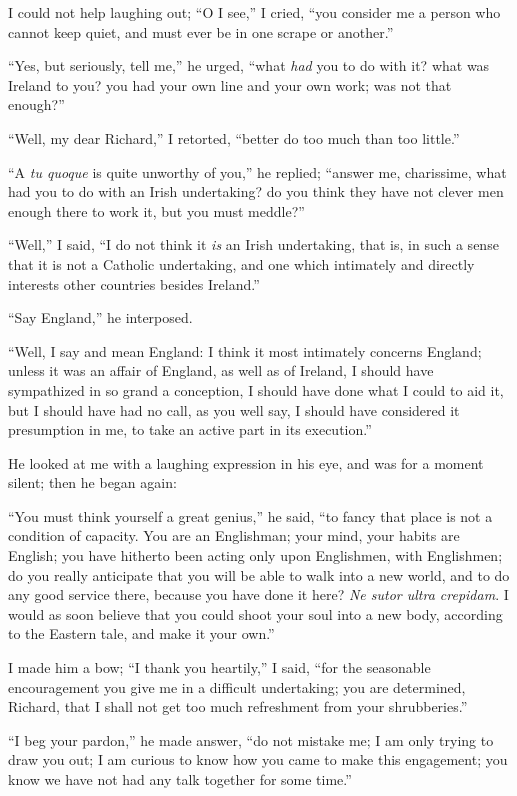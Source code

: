 I could not help laughing out; ``O I see,'' I cried,
``you consider me a person who cannot keep quiet, and must ever be
in one scrape or another.''

``Yes, but seriously, tell me,'' he urged, ``what \emph{had}
you to do with it? what was Ireland to you? you had your own line and
your own work; was not that enough?''

``Well, my dear Richard,'' I retorted, ``better do too
much than too little.''

``A \emph{tu quoque} is quite unworthy of you,'' he
replied; ``answer me, charissime, what had you to do with an Irish
undertaking? do you think they have not clever men enough there to
work it, but you must meddle?''

``Well,'' I said, ``I do not think it \emph{is} an
Irish undertaking, that is, in such a sense that it is not a Catholic
undertaking, and one which intimately and directly interests other
countries besides Ireland.''

``Say England,'' he interposed.

``Well, I say and mean England: I think it most intimately
concerns England; unless it was an affair of England, as well as of
Ireland, I should have sympathized in so grand a conception, I should
have done what I could to aid it, but I should have had no call, as
you well say, I should have considered it presumption in me, to take
an active part in its execution.''

He looked at me with a laughing expression in his eye, and was for
a moment silent; then he began again:

``You must think yourself a great genius,'' he said,
``to fancy that place is not a condition of capacity. You are an
Englishman; your mind, your habits are English; you have hitherto been
acting only upon Englishmen, with Englishmen; do you really anticipate
that you will be able to walk into a new world, and to do any good
service there, because you have done it here? \emph{Ne sutor ultra
crepidam}. I would as soon believe that you could shoot your
soul into a new body, according to the Eastern tale, and make it your
own.''

I made him a bow; ``I thank you heartily,'' I said,
``for the seasonable encouragement you give me in a difficult
undertaking; you are determined, Richard, that I shall not get too
much refreshment from your shrubberies.''

``I beg your pardon,'' he made answer, ``do not mistake
me; I am only trying to draw you out; I am curious to know how you
came to make this engagement; you know we have not had any talk
together for some time.''

